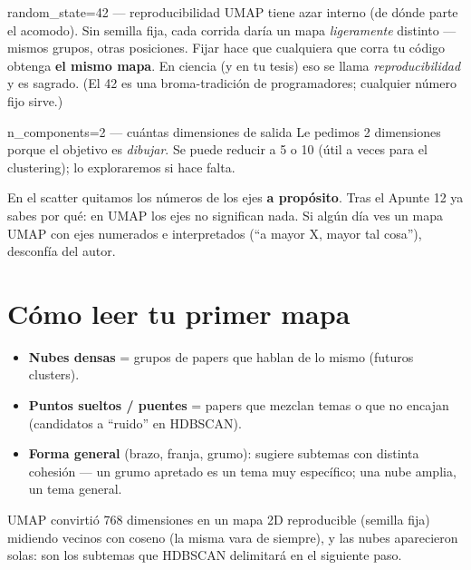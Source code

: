 \documentclass[11pt,a4paper]{article}
\begin{document}
\begin{concepto}{random\_state=42 — reproducibilidad}
UMAP tiene azar interno (de dónde parte el acomodo). Sin semilla fija, cada corrida daría un
mapa \emph{ligeramente} distinto — mismos grupos, otras posiciones. Fijar
 hace que cualquiera que corra tu código obtenga \textbf{el mismo
mapa}. En ciencia (y en tu tesis) eso se llama \emph{reproducibilidad} y es sagrado.
(El 42 es una broma-tradición de programadores; cualquier número fijo sirve.)
\end{concepto}

\begin{concepto}{n\_components=2 — cuántas dimensiones de salida}
Le pedimos 2 dimensiones porque el objetivo es \emph{dibujar}. Se puede reducir a 5 o 10
(útil a veces para el clustering); lo exploraremos si hace falta.
\end{concepto}

\begin{ojo}
En el scatter quitamos los números de los ejes \textbf{a propósito}. Tras el Apunte 12 ya
sabes por qué: en UMAP los ejes no significan nada. Si algún día ves un mapa UMAP con ejes
numerados e interpretados (``a mayor X, mayor tal cosa''), desconfía del autor.
\end{ojo}

\section{Cómo leer tu primer mapa}

\begin{itemize}
  \item \textbf{Nubes densas} = grupos de papers que hablan de lo mismo (futuros clusters).
  \item \textbf{Puntos sueltos / puentes} = papers que mezclan temas o que no encajan
        (candidatos a ``ruido'' en HDBSCAN).
  \item \textbf{Forma general} (brazo, franja, grumo): sugiere subtemas con distinta cohesión
        --- un grumo apretado es un tema muy específico; una nube amplia, un tema general.
\end{itemize}

\begin{resumen}
UMAP convirtió 768 dimensiones en un mapa 2D reproducible (semilla fija) midiendo vecinos
con coseno (la misma vara de siempre), y las nubes aparecieron solas: son los subtemas que
HDBSCAN delimitará en el siguiente paso.
\end{resumen}
\clearpage
{}
{}
\end{document}
